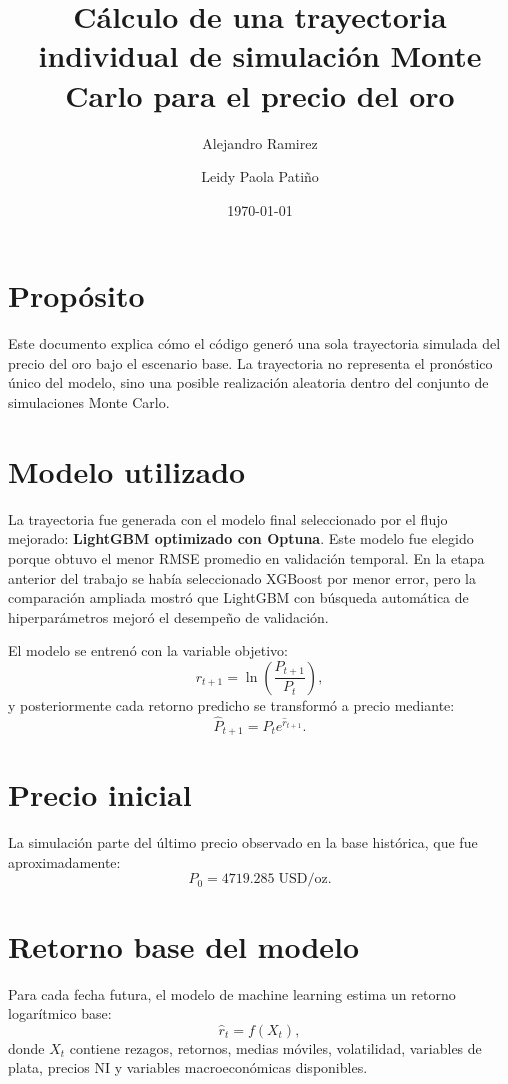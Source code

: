 \documentclass[12pt,letterpaper]{article}
\title{Cálculo de una trayectoria individual de simulación Monte Carlo para el precio del oro}
\author{Alejandro Ramirez \and Leidy Paola Patiño}
\date{\today}
\begin{document}
\maketitle

\section{Propósito}
Este documento explica cómo el código generó una sola trayectoria simulada del precio del oro bajo el escenario base. La trayectoria no representa el pronóstico único del modelo, sino una posible realización aleatoria dentro del conjunto de simulaciones Monte Carlo.

\section{Modelo utilizado}
La trayectoria fue generada con el modelo final seleccionado por el flujo mejorado: \textbf{LightGBM optimizado con Optuna}. Este modelo fue elegido porque obtuvo el menor RMSE promedio en validación temporal. En la etapa anterior del trabajo se había seleccionado XGBoost por menor error, pero la comparación ampliada mostró que LightGBM con búsqueda automática de hiperparámetros mejoró el desempeño de validación.

El modelo se entrenó con la variable objetivo:
\begin{equation}
r_{t+1}=\ln\left(\frac{P_{t+1}}{P_t}\right),
\end{equation}
y posteriormente cada retorno predicho se transformó a precio mediante:
\begin{equation}
\hat{P}_{t+1}=P_t e^{\hat{r}_{t+1}}.
\end{equation}

\section{Precio inicial}
La simulación parte del último precio observado en la base histórica, que fue aproximadamente:
\begin{equation}
P_0=4719.285\;\text{USD/oz}.
\end{equation}

\section{Retorno base del modelo}
Para cada fecha futura, el modelo de machine learning estima un retorno logarítmico base:
\begin{equation}
\hat{r}_t=f(X_t),
\end{equation}
donde $X_t$ contiene rezagos, retornos, medias móviles, volatilidad, variables de plata, precios NI y variables macroeconómicas disponibles.
\end{document}
